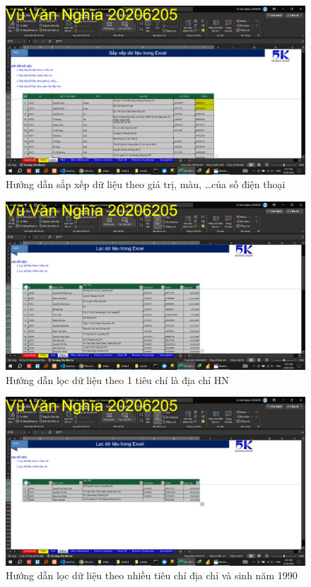 \documentclass{article}
\begin{document}
\begin{figure}[H]
\centering
\includegraphics[scale = 0.15]{Video1/HuongDan/3.png}
\caption{Hướng dẫn sắp xếp dữ liệu theo giá trị, màu, \dots của số điện thoại}
\end{figure}

\begin{figure}[H]
\centering
\includegraphics[scale = 0.15]{Video1/HuongDan/4.png}
\caption{Hướng dẫn lọc dữ liệu theo 1 tiêu chí là địa chỉ HN}
\end{figure}

\begin{figure}[H]
\centering
\includegraphics[scale = 0.15]{Video1/HuongDan/5.png}
\caption{Hướng dẫn lọc dữ liệu theo nhiều tiêu chí địa chỉ và sinh năm 1990}
\end{figure}
\end{document}
